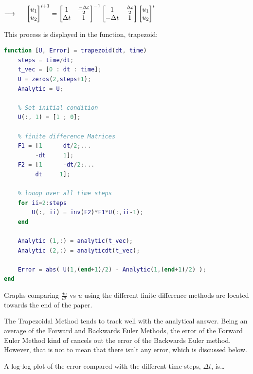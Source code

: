 \documentclass[12pt,letterpaper]{article}
\begin{document}
\begin{enumerate}
\begin{center} 
    $\longrightarrow \hspace{0.5 cm}  \begin{bmatrix} u_{1} \\ u_{2} \end{bmatrix}^{i+1} = \begin{bmatrix} 1&\frac{-\Delta t}{2} \\ \Delta t &1 \end{bmatrix}^{-1} \begin{bmatrix} 1&\frac{\Delta t}{2} \\ -\Delta t &1 \end{bmatrix}\begin{bmatrix} u_{1} \\ u_{2} \end{bmatrix}^{i}$
\end{center}

This process is displayed in the function, trapezoid:
\begin{lstlisting}[language = Matlab]
function [U, Error] = trapezoid(dt, time)
    steps = time/dt;
    t_vec = [0 : dt : time]; 
    U = zeros(2,steps+1);
    Analytic = U;
    
    % Set initial condition
    U(:, 1) = [1 ; 0];
    
    % finite difference Matrices
    F1 = [1      dt/2;...
         -dt     1];
    F2 = [1      -dt/2;...
         dt     1];
    
    % looop over all time steps
    for ii=2:steps
        U(:, ii) = inv(F2)*F1*U(:,ii-1);
    end
    
    Analytic (1,:) = analytic(t_vec);
    Analytic (2,:) = analyticdt(t_vec);

    Error = abs( U(1,(end+1)/2) - Analytic(1,(end+1)/2) ); 
end
\end{lstlisting}

Graphs comparing $\frac{du}{dt}$ vs $u$ using the different finite difference methods are located towards the end of the paper.

The Trapezoidal Method tends to track well with the analytical answer. Being an average of the Forward and Backwards Euler Methods, the error of the Forward Euler Method kind of cancels out the error of the Backwards Euler method. However, that is not to mean that there isn't any error, which is discussed below.

\newpage
A log-log plot of the error compared with the different time-steps, $\Delta t$, is\ldots


\end{enumerate}
\end{document}
